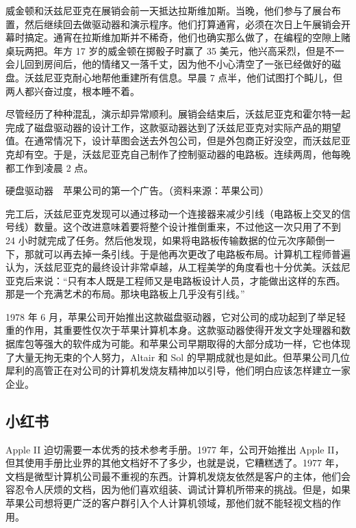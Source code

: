 \documentclass[12pt,UTF8]{ctexbook}
\begin{document}
威金顿和沃兹尼亚克在展销会前一天抵达拉斯维加斯。当晚，他们参与了展台布置，然后继续回去做驱动器和演示程序。他们打算通宵，必须在次日上午展销会开幕时搞定。通宵在拉斯维加斯并不稀奇，他们也确实那么做了，在编程的空隙上赌桌玩两把。年方 17 岁的威金顿在掷骰子时赢了 35 美元，他兴高采烈，但是不一会儿回到房间后，他的情绪又一落千丈，因为他不小心清空了一张已经做好的磁盘。沃兹尼亚克耐心地帮他重建所有信息。早晨 7 点半，他们试图打个盹儿，但两人都兴奋过度，根本睡不着。

尽管经历了种种混乱，演示却异常顺利。展销会结束后，沃兹尼亚克和霍尔特一起完成了磁盘驱动器的设计工作，这款驱动器达到了沃兹尼亚克对实际产品的期望值。在通常情况下，设计草图会送去外包公司，但是外包商正好没空，而沃兹尼亚克却有空。于是，沃兹尼亚克自己制作了控制驱动器的电路板。连续两周，他每晚都工作到凌晨 2 点。



硬盘驱动器　苹果公司的第一个广告。（资料来源：苹果公司）

完工后，沃兹尼亚克发现可以通过移动一个连接器来减少引线（电路板上交叉的信号线）数量。这个改进意味着要将整个设计推倒重来，不过他这一次只用了不到 24 小时就完成了任务。然后他发现，如果将电路板传输数据的位元次序颠倒一下，那就可以再去掉一条引线。于是他再次更改了电路板布局。计算机工程师普遍认为，沃兹尼亚克的最终设计非常卓越，从工程美学的角度看也十分优美。沃兹尼亚克后来说：“只有本人既是工程师又是电路板设计人员，才能做出这样的东西。那是一个充满艺术的布局。那块电路板上几乎没有引线。”

1978 年 6 月，苹果公司开始推出这款磁盘驱动器，它对公司的成功起到了举足轻重的作用，其重要性仅次于苹果计算机本身。这款驱动器使得开发文字处理器和数据库包等强大的软件成为可能。和苹果公司早期取得的大部分成功一样，它也体现了大量无拘无束的个人努力，Altair 和 Sol 的早期成就也是如此。但苹果公司几位犀利的高管正在对公司的计算机发烧友精神加以引导，他们明白应该怎样建立一家企业。





\subsection{小红书}


Apple II 迫切需要一本优秀的技术参考手册。1977 年，公司开始推出 Apple II，但其使用手册比业界的其他文档好不了多少，也就是说，它糟糕透了。1977 年，文档是微型计算机公司最不重视的东西。计算机发烧友依然是客户的主体，他们会容忍令人厌烦的文档，因为他们喜欢组装、调试计算机所带来的挑战。但是，如果苹果公司想将更广泛的客户群引入个人计算机领域，那他们就不能轻视文档的作用。
\end{document}
